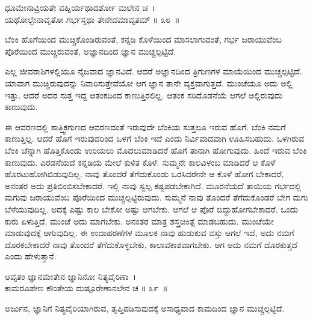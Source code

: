 \begin{shloka}
ಧೂಮೇನಾವ್ರಿಯತೇ ವಹ್ನಿರ್ಯಥಾದರ್ಶೋ ಮಲೇನ ಚ~।\\ಯಥೋಲ್ಬೇನಾವೃತೋ ಗರ್ಭಸ್ತಥಾ ತೇನೇದಮಾವೃತಮ್ \hfill॥ ೩೮~॥
\end{shloka}

\begin{artha}
ಬೆಂಕಿ ಹೊಗೆಯಿಂದ ಮುಚ್ಚಿಕೊಂಡಿರುವಂತೆ, ಕನ್ನಡಿ ಕೊಳೆಯಿಂದ ಮಾಸಲಾಗುವಂತೆ, ಗರ್ಭ ಜರಾಯುವೆಂಬ ಪೊರೆಯಿಂದ ಮುಚ್ಚಿರುವಂತೆ, ಅಜ್ಞಾನದಿಂದ ಜ್ಞಾನ ಮುಚ್ಚಲ್ಪಟ್ಟಿದೆ.
\end{artha}

ಎಲ್ಲ ಜೀವರಾಶಿಗಳಲ್ಲಿಯೂ ನೈಜವಾದ ಜ್ಞಾನವಿದೆ. ಆದರೆ ಅಜ್ಞಾನದಿಂದ ತ್ರಿಗುಣಗಳ ಮಾಯೆಯಿಂದ ಮುಚ್ಚಲ್ಪಟ್ಟಿದೆ. ಯಾವಾಗ ಮುಚ್ಚಿರುವುದನ್ನು ನಿವಾರಿಸುತ್ತೇವೆಯೋ ಆಗ ಜ್ಞಾನ ತಾನೇ ವ್ಯಕ್ತವಾಗುತ್ತದೆ. ಮುಂಚೆಯೂ ಅದು ಅಲ್ಲಿ ಇತ್ತು. ಆದರೆ ಅದರ ಸುತ್ತ ಇದ್ದ ಆತಂಕದಿಂದ ಕಾಣುತ್ತಿರಲಿಲ್ಲ. ಆತಂಕ ಸರಿದೊಡನೆಯೆ ಆಗಲೆ ಅಲ್ಲಿರುವುದು ಕಾಣುವುದು.

ಈ ಆವರಣದಲ್ಲಿ ಸಾತ್ತ್ವಿಕಗುಣದ ಆವರಣದಂತೆ ಇರುವುದೇ ಬೆಂಕಿಯ ಸುತ್ತಲೂ ಇರುವ ಹೊಗೆ. ಬೆಂಕಿ ನಮಗೆ ಕಾಣುತ್ತಿಲ್ಲ. ಆದರೆ ಹೊಗೆ ಇರುವುದರಿಂದ ಒಳಗೆ ಬೆಂಕಿ ಇದೆ ಎಂದು ನಿರ್ವಿವಾದವಾಗಿ ಊಹಿಸಬಹುದು. ಒಳಗಿರುವ ಬೆಂಕಿ ಚೆನ್ನಾಗಿ ಹೊತ್ತಿಕೊಂಡು ಉರಿಯಲು ಮೊದಲುಮಾಡಿದರೆ ಹೊಗೆ ತಾನಾಗಿ ಹೋಗುವುದು. ಹಿಂದೆ ಇರುವ ಬೆಂಕಿ ಕಾಣುವುದು. ಎರಡನೆಯದೆ ಕನ್ನಡಿಯ ಮೇಲೆ ಕುಳಿತ ಕೊಳೆ. ಸುಮ್ಮನೇ ಕಾಲವಿಳಂಬ ಮಾಡಿದರೆ ಆ ಕೊಳೆ ಹೊರಟುಹೋಗಿಬಿಡುವುದಿಲ್ಲ. ನಾವು ತೊಂದರೆ ತೆಗೆದುಕೊಂಡು ಒರಸಿದರೇನೇ ಆ ಕೊಳೆ ಹೋಗ ಬೇಕಾದರೆ, ಅನಂತರ ಅದು ಪ್ರತಿಬಿಂಬಿಸಬೇಕಾದರೆ. ಇಲ್ಲಿ ನಾವು ಸ್ವಲ್ಪ ಕಷ್ಟಪಡಬೇಕಾಗಿದೆ. ಮೂರನೆಯದೆ ತಾಯಿಯ ಗರ್ಭದಲ್ಲಿ ಮಗುವು ಜರಾಯುವೆಂಬ ಪೊರೆಯಿಂದ ಮುಚ್ಚಲ್ಪಟ್ಟಿರುವುದು. ಸುಮ್ಮನೆ ನಾವು ತೊಂದರೆ ತೆಗೆದುಕೊಂಡರೆ ಬೇಗ ಮಗು ಬೆಳೆಯುವುದಿಲ್ಲ. ಅದಕ್ಕೆ ಎಷ್ಟು ಕಾಲ ಬೇಕೋ ಅಷ್ಟು ಆಗಬೇಕು. ಆಗಲೆ ಆ ಪೊರೆ ಬಿದ್ದುಹೋಗಬೇಕಾದರೆ. ಒಂದು ಕುರು ಏಳುತ್ತಿದೆ. ಮುಂಚೆ ಅದು ಮಾಗಬೇಕು. ಅನಂತರ ಮಾತ್ರ ಶಸ್ತ್ರಚಿಕಿತ್ಸೆ ಮಾಡಬಹುದು. ಮುಂಚೆಯೇ ಮಾಡುವುದಕ್ಕೆ ಆಗುವುದಿಲ್ಲ. ಈ ಉದಾಹರಣೆಗಳ ಮೂಲಕ ನಾವು ಹುಡುಕುವ ವಸ್ತು ಆಗಲೆ ಇದೆ, ಅದು ನಮಗೆ ದೊರಕಬೇಕಾದರೆ ನಾವು ತೊಂದರೆ ತೆಗೆದುಕೊಳ್ಳಬೇಕು, ಕಾಲಾವಕಾಶವಾಗಬೇಕು. ಆಗ ಅದು ನಮಗೆ ದೊರಕುತ್ತದೆ ಎಂದು ಹೇಳುತ್ತಾನೆ.

\begin{shloka}
ಆವೃತಂ ಜ್ಞಾನಮೇತೇನ ಜ್ಞಾನಿನೋ ನಿತ್ಯವೈರಿಣಾ~।\\ಕಾಮರೂಪೇಣ ಕೌಂತೇಯ ದುಷ್ಪೂರೇಣಾನಲೇನ ಚ \hfill॥ ೩೯~॥
\end{shloka}

\begin{artha}
ಅರ್ಜುನ, ಜ್ಞಾನಿಗೆ ನಿತ್ಯವೈರಿಯಾಗಿರುವ, ತೃಪ್ತಿಪಡಿಸುವುದಕ್ಕೆ ಅಸಾಧ್ಯವಾದ ಕಾಮದಿಂದ ಜ್ಞಾನ ಮುಚ್ಚಲ್ಪಟ್ಟಿದೆ.
\end{artha}

\newpage

